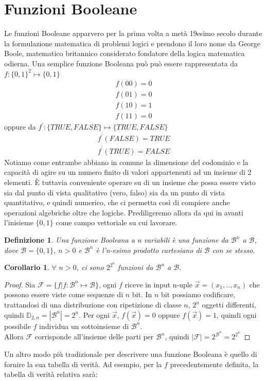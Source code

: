 \documentclass[12pt,a4paper,openright]{report}
\newtheorem{mydef}{Definizione}[chapter]
\newtheorem*{mycor}{Corollario}
\begin{document}
\section{Funzioni Booleane}
Le funzioni Booleane apparvero per la prima volta a metà 19esimo secolo durante la formulazione matematica di problemi logici e prendono
il loro nome da George Boole, matematico britannico considerato fondatore della logica matematica odierna\cite{ref2}.\newpage
Una semplice funzione Booleana può può essere rappresentata da \\$f:\{0,1\}^2 \mapsto \{0,1\}$
\begin{align*}
    f(00) = 0 \\
    f(01) = 0 \\
    f(10) = 1 \\
    f(11) = 0
\end{align*}
oppure da $f^\prime:\{TRUE,FALSE\}\mapsto{\{TRUE,FALSE\}}$
\begin{align*}
    f^\prime(FALSE) = TRUE \\
    f^\prime(TRUE) = FALSE 
\end{align*}
Notiamo come entrambe abbiano in comune la dimensione del codominio e la capacità di agire su un numero finito di valori appartenenti ad un insieme di 2 elementi.
È tuttavia conveniente operare su di un insieme che possa essere visto sia dal punto di vista qualitativo (vero, falso)
sia da un punto di vista quantitativo, e quindi numerico, che ci permetta così di compiere anche operazioni algebriche oltre che logiche. Prediligeremo allora da qui in avanti l'inisieme
$\{0,1\}$ come campo vettoriale su cui lavorare.
\par
\begin{mydef}
    Una \textnormal{funzione Booleana a \textit{n} variabili} è una funzione da $\mathcal{B}^n$ a $\mathcal{B}$,
    dove $\mathcal{B} = \{0,1\}$, $n > 0$ e $\mathcal{B}^n$ è l'n-esimo prodotto cartesiano di $\mathcal{B}$ con se stesso.\cite{ref3}
\end{mydef}
\begin{mycor}
    $\forall$ $n > 0$, ci sono $2^{2^{n}}$ funzioni da $\mathcal{B}^n$ a $\mathcal{B}.$
\end{mycor}
\begin{proof}
    Sia $\mathcal{F}=\{f|f:\mathcal{B}^n\mapsto{\mathcal{B}}\}$,
    ogni $f$ riceve in input n-uple $\vec{x}=(x_1,..,x_n)$ che possono essere viste come sequenze di $n$ bit.
    In $n$ bit possiamo codificare, trattandosi di una distribuzione con ripetizione di classe $n$, $2^n$ oggetti differenti, quindi $\mathbb{D}_{2,n}=\left\vert{\mathcal{B}^n}\right\vert = 2^n$.
    Per ogni $\vec{x}$, $f(\vec{x}) = 0$  oppure  $f(\vec{x}) = 1$, quindi ogni possibile $f$ individua un sottoinsieme di $\mathcal{B}^n$.\\
    Allora $\mathcal{F}$ corrisponde all'insieme delle parti per $\mathcal{B}^n$, quindi  $\left\vert{\mathcal{F}}\right\vert = 2^{\mathcal{B}^n}=2^{2^{n}}$

\end{proof}
Un altro modo più tradizionale per descrivere una funzione Booleana è quello di fornire la sua tabella di verità.
Ad esempio, per la $f$ precedentemente definita, la tabella di verità relativa sarà:
\end{document}
